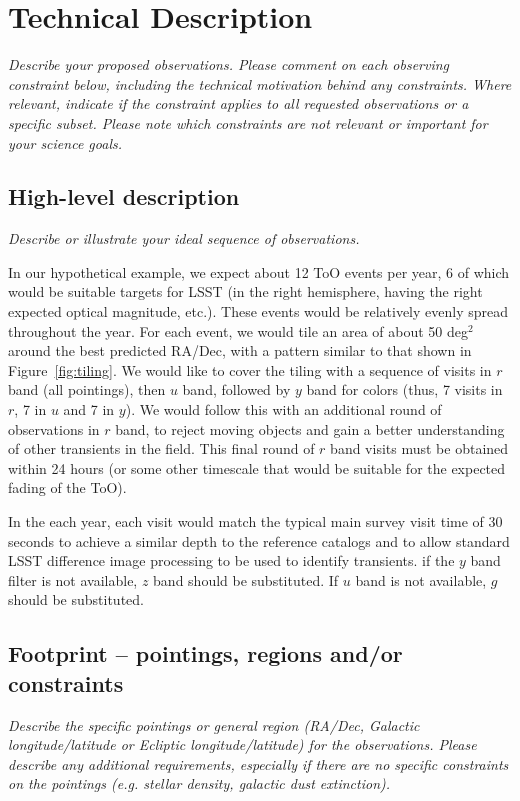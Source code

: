 \documentclass[11pt]{article}
\begin{document}
\clearpage

\section{Technical Description}
\begin{footnotesize}
{\it Describe your proposed observations. Please comment on each observing constraint
below, including the technical motivation behind any constraints. Where relevant, indicate
if the constraint applies to all requested observations or a specific subset. Please note which 
constraints are not relevant or important for your science goals.}
\end{footnotesize}

\subsection{High-level description}
\begin{footnotesize}
{\it Describe or illustrate your ideal sequence of observations.}
\end{footnotesize}

In our hypothetical example, we expect about 12 ToO events per year, 6 of which would be suitable targets for LSST (in the right hemisphere, 
having the right expected optical magnitude, etc.). These events would be relatively evenly spread throughout 
the year. For each event, we would tile an area of about 50 deg$^2$ around
the best predicted RA/Dec, with a pattern similar to that shown in Figure~\ref{fig:tiling}. We would like to cover
the tiling with a sequence of visits in $r$ band (all pointings), then $u$ band, followed by $y$ band for colors (thus, 7 visits in
$r$, 7 in $u$ and 7 in $y$).  We would follow this with an additional round of observations in $r$ band, to reject moving objects
and gain a better understanding of other transients in the field. This final round of $r$ band visits must be obtained within 24 hours
(or some other timescale that would be suitable for the expected fading of the ToO).  

In the each year, each visit would match the typical main survey visit time of 30 seconds to achieve a similar depth to the reference catalogs
and to allow standard LSST difference image processing to be used to identify transients. 
if the $y$ band filter is not available, $z$ band should be substituted. If $u$ band is not available, $g$ should be substituted.

\subsection{Footprint -- pointings, regions and/or constraints}
\begin{footnotesize}{\it Describe the specific pointings or general region (RA/Dec, Galactic longitude/latitude or 
Ecliptic longitude/latitude) for the observations. Please describe any additional requirements, especially if there
are no specific constraints on the pointings (e.g. stellar density, galactic dust extinction).}
\end{footnotesize}
\end{document}
